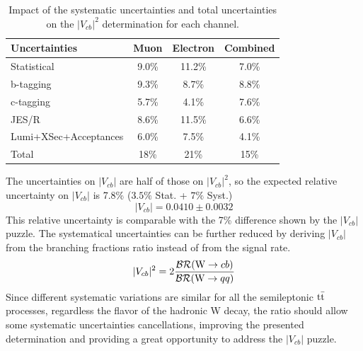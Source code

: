 \begin{table}[H]
    \centering
    \begin{tabular}{l|ccc}
    \toprule
    \textbf{Uncertainties} & \textbf{Muon} & \textbf{Electron} & \textbf{Combined}\\
    \midrule
         Statistical  & 9.0\% & 11.2\% & 7.0\% \\
         \midrule
         b-tagging    & 9.3\% &   8.7\% & 8.8\% \\
         c-tagging   & 5.7\% & 4.1\%& 7.6\% \\
         JES/R   & 8.6\% & 11.5\%& 6.6\%\\
         Lumi+XSec+Acceptances  & 6.0\% & 7.5\%& 4.1\% \\
         \midrule
         Total   & 18\% & 21\%& 15\%\\
         \bottomrule
    \end{tabular}
    \caption{Impact of the systematic uncertainties and total uncertainties on the $|V_{cb}|^2$ determination for each channel.}
    \label{tab:res}
\end{table}

The uncertainties on $|V_{cb}|$ are half of those on $|V_{cb}|^2$, so the expected relative uncertainty on $|V_{cb}|$ is 7.8\% ($3.5\%$ Stat. + $7\%$ Syst.)
\begin{equation*}
    |V_{cb}|=0.0410 \pm 0.0032
\end{equation*}
This relative uncertainty is comparable with the 7\% difference shown by the $|V_{cb}|$ puzzle.
The systematical uncertainties can be further reduced by deriving $|V_{cb}|$ from the branching fractions ratio instead of from the signal rate.
\begin{equation*}
    |V_{cb}|^2=2\frac{\mathcal{BR}({\text{W}} \to cb)}{\mathcal{BR}({\text{W}} \to qq)}
\end{equation*}
Since different systematic variations are similar for all the semileptonic ${{\text{t}}{\bar{\text{t}}}}$ processes, regardless the flavor of the hadronic W decay, the ratio should allow some systematic uncertainties cancellations, improving the presented determination and providing a great opportunity to address the $|V_{cb}|$ puzzle.\\



\hspace{0pt}
\vfill



